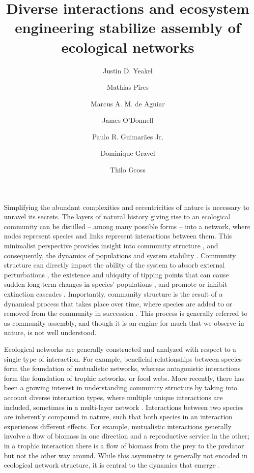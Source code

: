 \documentclass[9pt,twocolumn,twoside]{pnas-new}
\title{Diverse interactions and ecosystem engineering stabilize assembly of ecological networks}
\author[a,b]{Justin D. Yeakel}
\author[c]{Mathias Pires}
\author[c]{Marcus A. M. de Aguiar}
\author[d]{James O'Donnell}
\author[e]{Paulo R. Guimar\~aes Jr.}
\author[f]{Dominique Gravel}
\author[g]{Thilo Gross}
\affil[a]{School of Natural Sciences, University of California Merced, Merced, CA 95343, USA}
\affil[b]{Santa Fe Institute}
\affil[c]{Universidade Estadual de Campinas}
\affil[d]{University of Washington}
\affil[e]{Universidade de S\~ao Paulo}
\affil[f]{Universit\`e de Sherbrooke}
\affil[g]{University of California Davis, Davis CA}
\begin{document}
\verticaladjustment{-2pt}

\maketitle
\thispagestyle{firststyle}


Simplifying the abundant complexities and eccentricities of nature is necessary to unravel its secrets.
The layers of natural history giving rise to an ecological community can be distilled -- among many possible forms -- into a network, where nodes represent species and links represent interactions between them.
This minimalist perspective provides insight into community structure \cite{Dunne2002,Pascual2006}, and consequently, the dynamics of populations and system stability \cite{May1972,Gross2009,Allesina2012}.
Community structure can directly impact the ability of the system to absorb external perturbations \cite{Novak2011,Aufderheide2013,Novak2016}, the existence and ubiquity of tipping points that can cause sudden long-term changes in species' populations \cite{Lade2011,Boettiger2012}, and promote or inhibit extinction cascades \cite{Stouffer2011,Yeakel2014}.
Importantly, community structure is the result of a dynamical process that takes place over time, where species are added to or removed from the community in succession \cite{Weiher2001}.
This process is generally referred to as community assembly, and though it is an engine for much that we observe in nature, is not well understood.

Ecological networks are generally constructed and analyzed with respect to a single type of interaction.
For example, beneficial relationships between species form the foundation of mutualistic networks, whereas antagonistic interactions form the foundation of trophic networks, or food webs. %
More recently, there has been a growing interest in understanding community structure by taking into account diverse interaction types, where multiple unique interactions are included, sometimes in a multi-layer network \cite{Kefi2016,Pilosof2017}.
Interactions between two species are inherently compound in nature, such that both species in an interaction experiences different effects.
For example, mutualistic interactions generally involve a flow of biomass in one direction and a reproductive service in the other; in a trophic interaction there is a flow of biomass from the prey to the predator but not the other way around.
While this asymmetry is generally not encoded in ecological network structure, it is central to the dynamics that emerge \cite{Gross2009,Allesina2012}.
\end{document}

